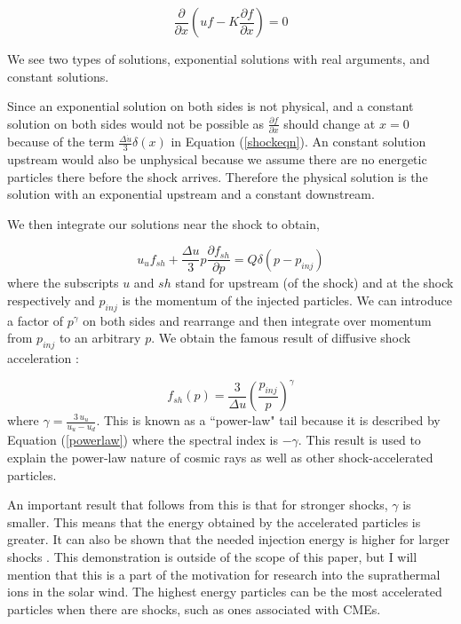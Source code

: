 \documentclass[%
 reprint,
 amsmath,amssymb,
 aps,
]{revtex4-1}
\begin{document}
\begin{equation}
\frac{\partial}{\partial x} \left( u f - K \frac{\partial f}{\partial x} \right) = 0
\end{equation}

We see two types of solutions, exponential solutions with real arguments, and constant solutions.

Since an exponential solution on both sides is not physical, and a constant solution on both sides would not be possible as $\displaystyle \frac{\partial f}{\partial x}$ should change at $x = 0$ because of the term $\displaystyle \frac{\Delta \dot u}{3} \delta (x)$ in Equation (\ref{shockeqn}). An constant solution upstream would also be unphysical because we assume there are no energetic particles there before the shock arrives. Therefore the physical solution is the solution with an exponential upstream and a constant downstream.

We then integrate our solutions near the shock to obtain,

\begin{equation}
u_u f_{sh} + \frac{\Delta u}{3} p \frac{\partial f_{sh}}{\partial p} = Q \delta (p-p_{inj})
\end{equation}
where the subscripts $u$ and $sh$ stand for upstream (of the shock) and at the shock respectively and $p_{inj}$ is the momentum of the injected particles. We can introduce a factor of $p^{\gamma}$ on both sides and rearrange and then integrate over momentum from $p_{inj}$ to an arbitrary $p$. We obtain the famous result of diffusive shock acceleration \cite{diffshock}:

\begin{equation}
f_{sh} (p) = \frac{3}{\Delta u} (\frac{p_{inj}}{p})^{\gamma}
\end{equation}
where $\displaystyle \gamma = \frac{3 \, u_u}{u_u - u_d}$. This is known as a ``power-law" tail because it is described by Equation (\ref{powerlaw}) where the spectral index is $-\gamma$. This result is used to explain the power-law nature of cosmic rays as well as other shock-accelerated particles. 

An important result that follows from this is that for stronger shocks, $\gamma$ is smaller. This means that the energy obtained by the accelerated particles is greater. It can also be shown that the needed injection energy is higher for larger shocks \cite{injection}. This demonstration is outside of the scope of this paper, but I will mention that this is a part of the motivation for research into the suprathermal ions in the solar wind. The highest energy particles can be the most accelerated particles when there are shocks, such as ones associated with CMEs.
\end{document}
